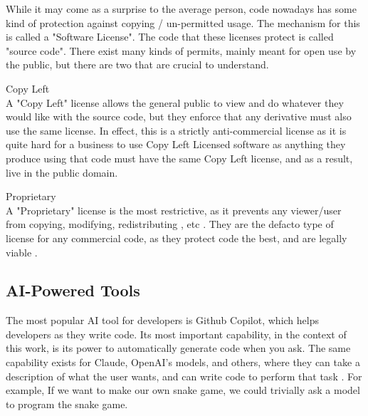 \documentclass[journal]{IEEEtran}
\begin{document}
While it may come as a surprise to the average person,
code nowadays has some kind of protection against
copying / un-permitted usage. The mechanism for this
is called a "Software License"\cite{Blackduck}.
The code that these licenses protect is called "source code".
There exist many kinds of permits, mainly meant for
open use by the public, but there are two that are crucial to understand.

\begin{IEEEitemize}
\item Copy Left 
\\
  A "Copy Left" license allows the general public to view and do whatever they
  would like with the source code, but they enforce that any derivative must
  also use the same license. In effect, this is a strictly anti-commercial license
  as it is quite hard for a business to use Copy Left Licensed software as
  anything they produce using that code must have the same
  Copy Left license, and as a result, live in the public domain.
  \cite{Blackduck}

\item Proprietary 
\\
A "Proprietary" license is the most restrictive, as it prevents any viewer/user from
copying, modifying, redistributing , etc \cite{Blackduck}. They are the defacto type of license for any
commercial code, as they protect code the best, and are legally viable \cite{harvard}. 
    
\end{IEEEitemize}



\subsection{AI-Powered Tools}

The most popular AI tool for developers is Github Copilot, which
helps developers as they write code. Its most important capability, in
the context of this work, is its power to automatically generate code when
you ask. The same capability exists for Claude, OpenAI's models, and others,
where they can take a description of what the
user wants, and can write code to perform that task \cite{s_2023}. For example, If we
want to make our own snake game, we could trivially ask a model to
program the snake game.

\end{document}
